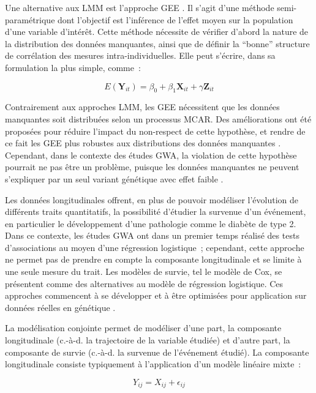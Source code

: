\documentclass[11pt,a4paper,notrimn]{krantz}
\theoremstyle{definition}
\theoremstyle{definition}
\theoremstyle{remark}
\begin{document}
Une alternative aux LMM est l'approche GEE
\citep{liang_longitudinal_1986}. Il s'agit d'une méthode
semi-paramétrique dont l'objectif est l'inférence de l'effet moyen sur
la population d'une variable d'intérêt. Cette méthode nécessite de
vérifier d'abord la nature de la distribution des données manquantes,
ainsi que de définir la ``bonne'' structure de corrélation des mesures
intra-individuelles. Elle peut s'écrire, dans sa formulation la plus
simple, comme~:

\begin{equation}E(\boldsymbol{Y}_{it})=\beta_0+\beta_1 \boldsymbol{X}_{it}+ \gamma \boldsymbol{Z}_{it}\label{eq:GEE}\end{equation}

Contrairement aux approches LMM, les GEE nécessitent que les données
manquantes soit distribuées selon un processus MCAR. Des améliorations
ont été proposées pour réduire l'impact du non-respect de cette
hypothèse, et rendre de ce fait les GEE plus robustes aux distributions
des données manquantes
\citep{robins_analysis_1995, robins_estimation_1994}. Cependant, dans le
contexte des études GWA, la violation de cette hypothèse pourrait ne pas
être un problème, puisque les données manquantes ne peuvent s'expliquer
par un seul variant génétique avec effet faible
\citep{sitlani_generalized_2015}.

Les données longitudinales offrent, en plus de pouvoir modéliser
l'évolution de différents traits quantitatifs, la possibilité d'étudier
la survenue d'un événement, en particulier le développement d'une
pathologie comme le diabète de type 2. Dans ce contexte, les études GWA
ont dans un premier temps réalisé des tests d'associations au moyen
d'une régression logistique~; cependant, cette approche ne permet pas de
prendre en compte la composante longitudinale et se limite à une seule
mesure du trait. Les modèles de survie, tel le modèle de Cox, se
présentent comme des alternatives au modèle de régression logistique.
Ces approches commencent à se développer et à être optimisées pour
application sur données réelles en génétique
\citep{syed_evaluation_2016, syed_survivalgwas_power:_2016}.

La modélisation conjointe permet de modéliser d'une part, la composante
longitudinale (c.-à-d. la trajectoire de la variable étudiée) et d'autre
part, la composante de survie (c.-à-d. la survenue de l'événement
étudié). La composante longitudinale consiste typiquement à
l'application d'un modèle linéaire mixte~:

\begin{equation}Y_{ij}=X_{ij}+\epsilon_{ij}\label{eq:eq1}\end{equation}
\end{document}
